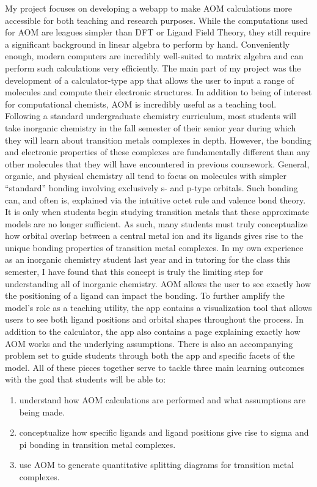 \documentclass[10pt,twocolumn]{article}
\begin{document}
My project focuses on developing a webapp to make AOM calculations more accessible for both teaching and research purposes. While the computations used for AOM are leagues simpler than DFT or Ligand Field Theory, they still require a significant background in linear algebra to perform by hand. Conveniently enough, modern computers are incredibly well-suited to matrix algebra and can perform such calculations very efficiently. The main part of my project was the development of a calculator-type app that allows the user to input a range of molecules and compute their electronic structures. In addition to being of interest for computational chemists, AOM is incredibly useful as a teaching tool. Following a standard undergraduate chemistry curriculum, most students will take inorganic chemistry in the fall semester of their senior year during which they will learn about transition metals complexes in depth. However, the bonding and electronic properties of these complexes are fundamentally different than any other molecules that they will have encountered in previous coursework. General, organic, and physical chemistry all tend to focus on molecules with simpler ``standard'' bonding involving exclusively s- and p-type orbitals. Such bonding can, and often is, explained via the intuitive octet rule and valence bond theory. It is only when students begin studying transition metals that these approximate models are no longer sufficient. As such, many students must truly conceptualize how orbital overlap between a central metal ion and its ligands gives rise to the unique bonding properties of transition metal complexes. In my own experience as an inorganic chemistry student last year and in tutoring for the class this semester, I have found that this concept is truly the limiting step for understanding all of inorganic chemistry. AOM allows the user to see exactly how the positioning of a ligand can impact the bonding. To further amplify the model’s role as a teaching utility, the app contains a visualization tool that allows users to see both ligand positions and orbital shapes throughout the process. In addition to the calculator, the app also contains a page explaining exactly how AOM works and the underlying assumptions. There is also an accompanying problem set to guide students through both the app and specific facets of the model. All of these pieces together serve to tackle three main learning outcomes with the goal that students will be able to:
\begin{enumerate}
	\item understand how AOM calculations are performed and what assumptions are being made.
	\item conceptualize how specific ligands and ligand positions give rise to sigma and pi bonding in transition metal complexes.
	\item use AOM to generate quantitative splitting diagrams for transition metal complexes.
\end{enumerate}
\end{document}
